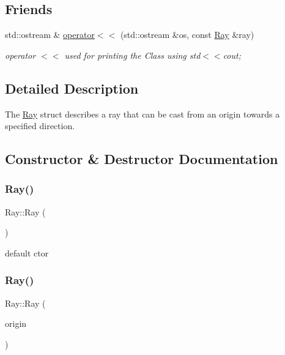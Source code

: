 \subsection*{Friends}
\begin{DoxyCompactItemize}
\item 
std\+::ostream \& \mbox{\hyperlink{struct_ray_a5c8a3bf0a8e125a67943f442cbbf8e06}{operator$<$$<$}} (std\+::ostream \&os, const \mbox{\hyperlink{struct_ray}{Ray}} \&ray)
\begin{DoxyCompactList}\small\item\em operator $<$$<$ used for printing the Class using std$<$$<$cout; \end{DoxyCompactList}\end{DoxyCompactItemize}


\subsection{Detailed Description}
The \mbox{\hyperlink{struct_ray}{Ray}} struct describes a ray that can be cast from an origin towards a specified direction. 

\subsection{Constructor \& Destructor Documentation}
\mbox{\label{struct_ray_a2e3d2c29f2df4ab3da10da79d4acb852}} 
\subsubsection{\texorpdfstring{Ray()}{Ray()}\hspace{0.1cm}{\footnotesize\ttfamily [1/4]}}
{\footnotesize\ttfamily Ray\+::\+Ray (\begin{DoxyParamCaption}{ }\end{DoxyParamCaption})}

default c\textquotesingle{}tor \mbox{\label{struct_ray_a92effebbda59de6b4f889718dec7520a}} 
\subsubsection{\texorpdfstring{Ray()}{Ray()}\hspace{0.1cm}{\footnotesize\ttfamily [2/4]}}
{\footnotesize\ttfamily Ray\+::\+Ray (\begin{DoxyParamCaption}\item[{const Q\+Vector3D \&}]{origin }\end{DoxyParamCaption})}

